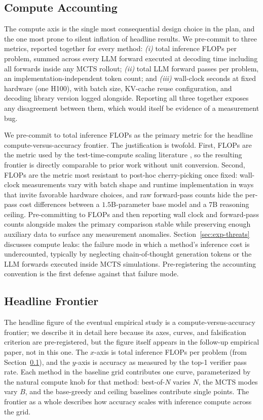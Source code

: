 \subsection{Compute Accounting}
\label{sec:exp-compute}

The compute axis is the single most consequential design choice in the
plan, and the one most prone to silent inflation of headline results.
We pre-commit to three metrics, reported together for every method:
\emph{(i)} total inference FLOPs per problem, summed across every LLM
forward executed at decoding time including all forwards inside any
MCTS rollout; \emph{(ii)} total LLM forward passes per problem, an
implementation-independent token count; and \emph{(iii)} wall-clock
seconds at fixed hardware (one H100), with batch size, KV-cache reuse
configuration, and decoding library version logged alongside.
Reporting all three together exposes any disagreement between them,
which would itself be evidence of a measurement bug.

We pre-commit to total inference FLOPs as the primary metric for the
headline compute-versus-accuracy frontier. The justification is
twofold. First, FLOPs are the metric used by the test-time-compute
scaling literature \citep{snell2024scaling}, so the resulting frontier
is directly comparable to prior work without unit conversion. Second,
FLOPs are the metric most resistant to post-hoc cherry-picking once
fixed: wall-clock measurements vary with batch shape and runtime
implementation in ways that invite favorable hardware choices, and raw
forward-pass counts hide the per-pass cost differences between a
$1.5$B-parameter base model and a $7$B reasoning ceiling. Pre-committing
to FLOPs and then reporting wall clock and forward-pass counts
alongside makes the primary comparison stable while preserving enough
auxiliary data to surface any measurement anomalies. Section~\ref{sec:exp-threats}
discusses compute leaks: the failure mode in which a method's
inference cost is undercounted, typically by neglecting chain-of-thought
generation tokens or the LLM forwards executed inside MCTS simulations.
Pre-registering the accounting convention is the first defense against
that failure mode.

\subsection{Headline Frontier}
\label{sec:exp-frontier}

The headline figure of the eventual empirical study is a
compute-versus-accuracy frontier; we describe it in detail here because
its axes, curves, and falsification criterion are pre-registered, but
the figure itself appears in the follow-up empirical paper, not in this
one. The $x$-axis is total inference FLOPs
per problem (from Section~\ref{sec:exp-compute}), and the $y$-axis is
accuracy as measured by the top-1 verifier pass rate. Each method in
the baseline grid contributes one curve, parameterized by the natural
compute knob for that method: best-of-$N$ varies $N$, the MCTS modes
vary $B$, and the base-greedy and ceiling baselines contribute single
points. The frontier as a whole describes how accuracy scales with
inference compute across the grid.

